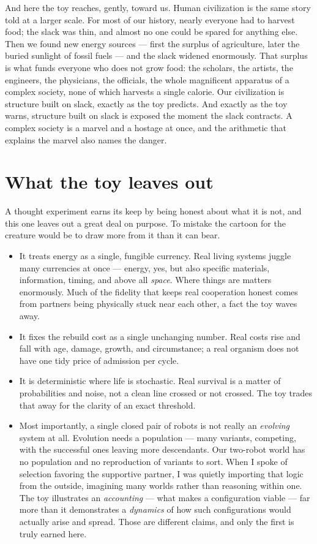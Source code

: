\documentclass{article}
\begin{document}
And here the toy reaches, gently, toward us. Human civilization is the same story told at a larger scale. For most of our history, nearly everyone had to harvest food; the slack was thin, and almost no one could be spared for anything else. Then we found new energy sources --- first the surplus of agriculture, later the buried sunlight of fossil fuels --- and the slack widened enormously. That surplus is what funds everyone who does not grow food: the scholars, the artists, the engineers, the physicians, the officials, the whole magnificent apparatus of a complex society, none of which harvests a single calorie. Our civilization is structure built on slack, exactly as the toy predicts. And exactly as the toy warns, structure built on slack is exposed the moment the slack contracts. A complex society is a marvel and a hostage at once, and the arithmetic that explains the marvel also names the danger.

\section*{What the toy leaves out}

A thought experiment earns its keep by being honest about what it is not, and this one leaves out a great deal on purpose. To mistake the cartoon for the creature would be to draw more from it than it can bear.

\begin{itemize}
    \item It treats energy as a single, fungible currency. Real living systems juggle many currencies at once --- energy, yes, but also specific materials, information, timing, and above all \emph{space}. Where things are matters enormously. Much of the fidelity that keeps real cooperation honest comes from partners being physically stuck near each other, a fact the toy waves away.
    \item It fixes the rebuild cost as a single unchanging number. Real costs rise and fall with age, damage, growth, and circumstance; a real organism does not have one tidy price of admission per cycle.
    \item It is deterministic where life is stochastic. Real survival is a matter of probabilities and noise, not a clean line crossed or not crossed. The toy trades that away for the clarity of an exact threshold.
    \item Most importantly, a single closed pair of robots is not really an \emph{evolving} system at all. Evolution needs a population --- many variants, competing, with the successful ones leaving more descendants. Our two-robot world has no population and no reproduction of variants to sort. When I spoke of selection favoring the supportive partner, I was quietly importing that logic from the outside, imagining many worlds rather than reasoning within one. The toy illustrates an \emph{accounting} --- what makes a configuration viable --- far more than it demonstrates a \emph{dynamics} of how such configurations would actually arise and spread. Those are different claims, and only the first is truly earned here.
\end{itemize}
\end{document}
